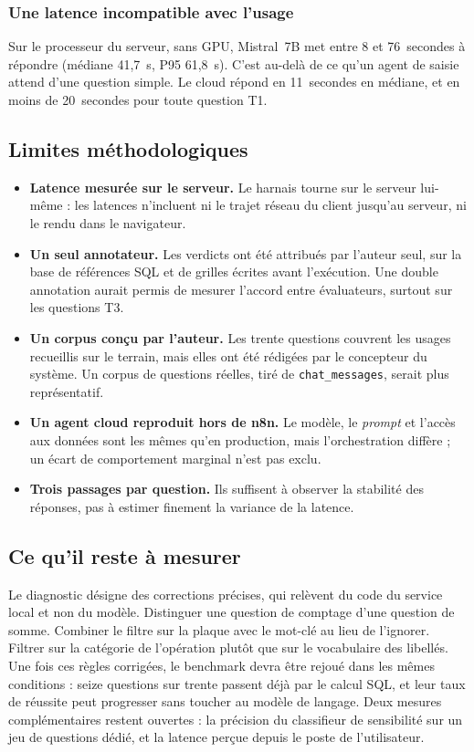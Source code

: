 \subsubsection{Une latence incompatible avec l'usage}

Sur le processeur du serveur, sans GPU, Mistral~7B met entre 8 et 76~secondes à répondre (médiane 41,7~s, P95 61,8~s). C'est au-delà de ce qu'un agent de saisie attend d'une question simple. Le cloud répond en 11~secondes en médiane, et en moins de 20~secondes pour toute question T1.

\subsection{Limites méthodologiques}
\label{sec:bench_limites}

\begin{itemize}
    \item \textbf{Latence mesurée sur le serveur.} Le harnais tourne sur le serveur lui-même : les latences n'incluent ni le trajet réseau du client jusqu'au serveur, ni le rendu dans le navigateur.
    \item \textbf{Un seul annotateur.} Les verdicts ont été attribués par l'auteur seul, sur la base de références SQL et de grilles écrites avant l'exécution. Une double annotation aurait permis de mesurer l'accord entre évaluateurs, surtout sur les questions T3.
    \item \textbf{Un corpus conçu par l'auteur.} Les trente questions couvrent les usages recueillis sur le terrain, mais elles ont été rédigées par le concepteur du système. Un corpus de questions réelles, tiré de \texttt{chat\_messages}, serait plus représentatif.
    \item \textbf{Un agent cloud reproduit hors de n8n.} Le modèle, le \textit{prompt} et l'accès aux données sont les mêmes qu'en production, mais l'orchestration diffère ; un écart de comportement marginal n'est pas exclu.
    \item \textbf{Trois passages par question.} Ils suffisent à observer la stabilité des réponses, pas à estimer finement la variance de la latence.
\end{itemize}

\subsection{Ce qu'il reste à mesurer}
\label{sec:bench_dettes}

Le diagnostic désigne des corrections précises, qui relèvent du code du service local et non du modèle. Distinguer une question de comptage d'une question de somme. Combiner le filtre sur la plaque avec le mot-clé au lieu de l'ignorer. Filtrer sur la catégorie de l'opération plutôt que sur le vocabulaire des libellés. Une fois ces règles corrigées, le benchmark devra être rejoué dans les mêmes conditions : seize questions sur trente passent déjà par le calcul SQL, et leur taux de réussite peut progresser sans toucher au modèle de langage. Deux mesures complémentaires restent ouvertes : la précision du classifieur de sensibilité sur un jeu de questions dédié, et la latence perçue depuis le poste de l'utilisateur.

